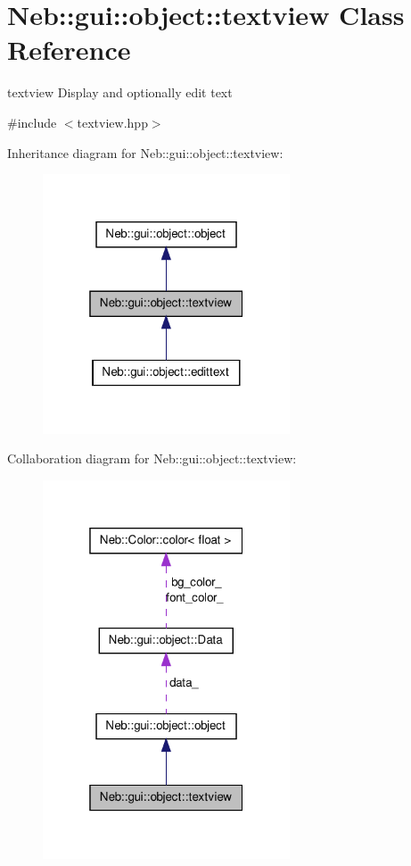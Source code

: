 \hypertarget{classNeb_1_1gui_1_1object_1_1textview}{\section{\-Neb\-:\-:gui\-:\-:object\-:\-:textview \-Class \-Reference}
\label{classNeb_1_1gui_1_1object_1_1textview}
}


textview \-Display and optionally edit text  




{\ttfamily \#include $<$textview.\-hpp$>$}



\-Inheritance diagram for \-Neb\-:\-:gui\-:\-:object\-:\-:textview\-:\nopagebreak
\begin{figure}[H]
\begin{center}
\leavevmode
\includegraphics[width=208pt]{classNeb_1_1gui_1_1object_1_1textview__inherit__graph}
\end{center}
\end{figure}


\-Collaboration diagram for \-Neb\-:\-:gui\-:\-:object\-:\-:textview\-:\nopagebreak
\begin{figure}[H]
\begin{center}
\leavevmode
\includegraphics[width=208pt]{classNeb_1_1gui_1_1object_1_1textview__coll__graph}
\end{center}
\end{figure}

